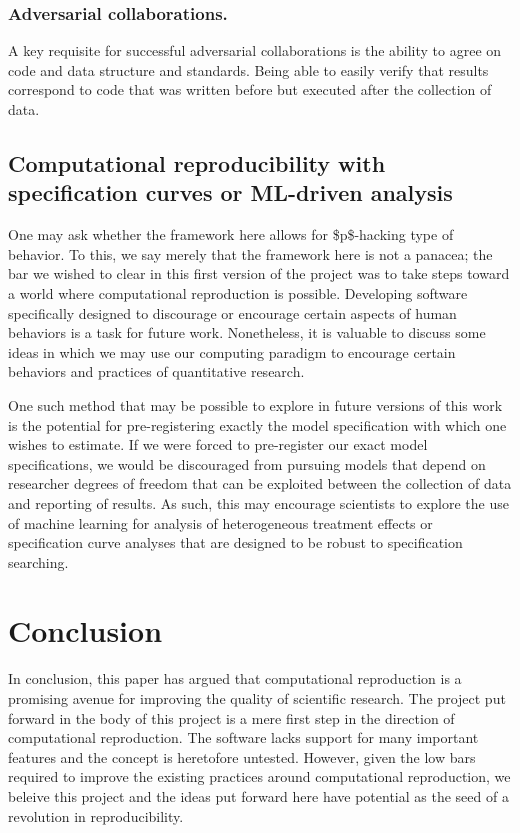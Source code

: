 \hypertarget{adversarial-collaborations.}{%
\subsubsection{Adversarial collaborations.}\label{adversarial-collaborations.}}

A key requisite for successful adversarial collaborations is the ability to agree on code and data structure and standards. Being able to easily verify that results correspond to code that was written before but executed after the collection of data.

\hypertarget{computational-reproducibility-with-specification-curves-or-ml-driven-analysis}{%
\subsection{Computational reproducibility with specification curves or ML-driven analysis}\label{computational-reproducibility-with-specification-curves-or-ml-driven-analysis}}

One may ask whether the framework here allows for \$p\$-hacking type of behavior. To this, we say merely that the framework here is not a panacea; the bar we wished to clear in this first version of the project was to take steps toward a world where computational reproduction is possible. Developing software specifically designed to discourage or encourage certain aspects of human behaviors is a task for future work. Nonetheless, it is valuable to discuss some ideas in which we may use our computing paradigm to encourage certain behaviors and practices of quantitative research.

One such method that may be possible to explore in future versions of this work is the potential for pre-registering exactly the model specification with which one wishes to estimate. If we were forced to pre-register our exact model specifications, we would be discouraged from pursuing models that depend on researcher degrees of freedom that can be exploited between the collection of data and reporting of results. As such, this may encourage scientists to explore the use of machine learning for analysis of heterogeneous treatment effects or specification curve analyses that are designed to be robust to specification searching. 

\hypertarget{conclusion}{%
\section{Conclusion}\label{conclusion}}

In conclusion, this paper has argued that computational reproduction is a promising avenue for improving the quality of scientific research. The project put forward in the body of this project is a mere first step in the direction of computational reproduction. The software lacks support for many important features and the concept is heretofore untested. However, given the low bars required to improve the existing practices around computational reproduction, we beleive this project and the ideas put forward here have potential as the seed of a revolution in reproducibility.
